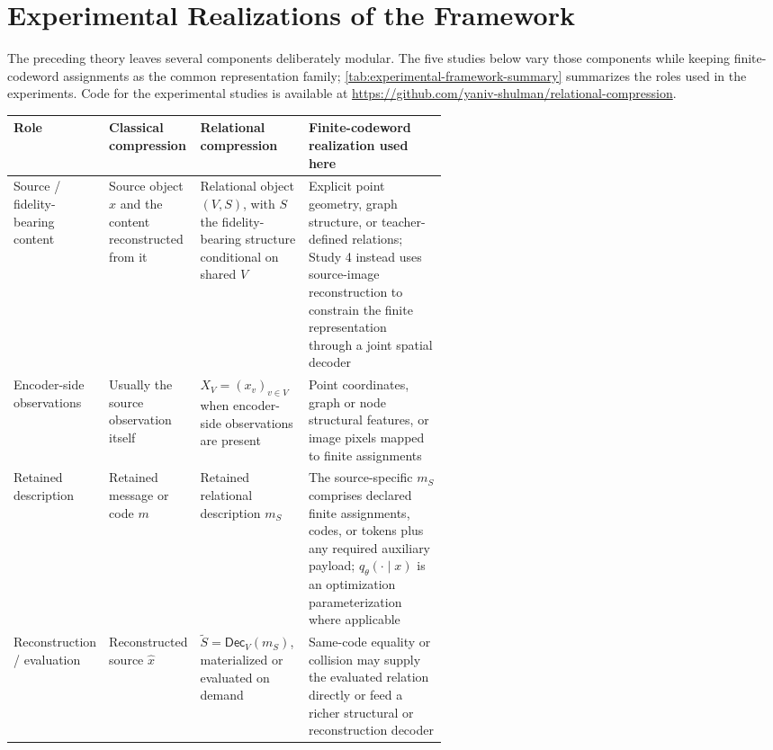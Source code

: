 \section{Experimental Realizations of the Framework}
\label{sec:experiments}

The preceding theory leaves several components deliberately modular.
The five studies below vary those components while keeping finite-codeword assignments as the common representation family; \cref{tab:experimental-framework-summary} summarizes the roles used in the experiments.
Code for the experimental studies is available at \url{https://github.com/yaniv-shulman/relational-compression}.

\begin{table}[t]
\centering
\scriptsize
\setlength{\tabcolsep}{2.5pt}
\renewcommand{\arraystretch}{1.08}
\setlength{\extrarowheight}{1pt}
\begin{tabularx}{\linewidth}{>{\raggedright\arraybackslash}p{0.13\linewidth}
                            >{\raggedright\arraybackslash}p{0.18\linewidth}
                            >{\raggedright\arraybackslash}p{0.25\linewidth}
                            >{\raggedright\arraybackslash}X}
\toprule
Role & Classical compression & Relational compression & Finite-codeword realization used here \\
\midrule
Source / fidelity-bearing content
& Source object $x$ and the content reconstructed from it
& Relational object $(V,S)$, with $S$ the fidelity-bearing structure conditional on shared $V$
& Explicit point geometry, graph structure, or teacher-defined relations; Study 4 instead uses source-image reconstruction to constrain the finite representation through a joint spatial decoder \\
Encoder-side observations
& Usually the source observation itself
& $X_V=(x_v)_{v\in V}$ when encoder-side observations are present
& Point coordinates, graph or node structural features, or image pixels mapped to finite assignments \\
Retained description
& Retained message or code $m$
& Retained relational description $m_S$
& The source-specific $m_S$ comprises declared finite assignments, codes, or tokens plus any required auxiliary payload; $q_\theta(\cdot\mid x)$ is an optimization parameterization where applicable \\
Reconstruction / evaluation
& Reconstructed source $\widehat x$
& $\widetilde S=\mathsf{Dec}_V(m_S)$, materialized or evaluated on demand
& Same-code equality or collision may supply the evaluated relation directly or feed a richer structural or reconstruction decoder \\

\end{tabularx}
\end{table}
